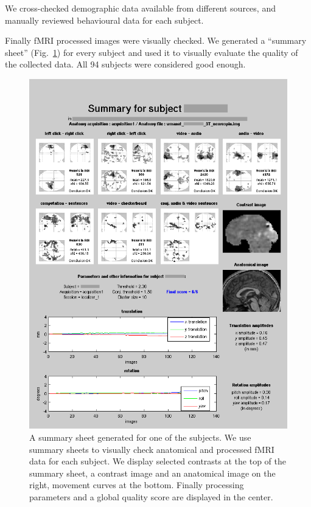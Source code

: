\documentclass[review]{elsarticle}
\begin{document}
We cross-checked demographic data available from different sources, and manually reviewed behavioural data for each subject.

Finally fMRI processed images were visually checked. We generated a ``summary sheet'' (Fig.~\ref{fig:summary}) for every subject and used it to visually evaluate the quality of the collected data. All 94 subjects were considered good enough.

\begin{figure}[ht!]
    \centering
    \includegraphics[scale=0.4]{summary}
    \caption{A summary sheet generated for one of the subjects. We use summary sheets to visually check anatomical and processed fMRI data for each subject. We display selected contrasts at the top of the summary sheet, a contrast image and an anatomical image on the right, movement curves at the bottom. Finally processing parameters and a global quality score are displayed in the center.}
    \label{fig:summary}
\end{figure}
\end{document}
